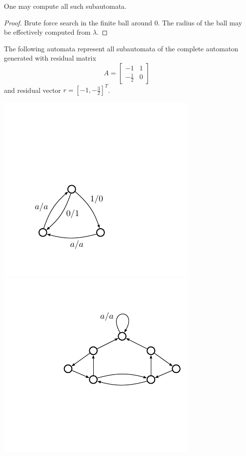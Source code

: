 \documentclass[11pt, titlepage]{article}
\begin{document}
\begin{lemma}
  One may compute all such subautomata.
\end{lemma}
\begin{proof}
  Brute force search in the finite ball around 0. The radius of the
  ball may be effectively computed from $\lambda$.
\end{proof}

\begin{example}
The following automata represent all subautomata of
the complete automaton generated with residual matrix
\[
  A = \begin{bmatrix}
    -1 &1\\
    -\frac{1}{2} & 0
    \end{bmatrix}
\]
and residual vector $r = [-1, -\frac{3}{2}]^T$.

\vspace{-5em}
\begin{center}
\includegraphics[scale=0.5]{figures/a32}
\includegraphics[scale=0.5]{figures/bowtie}

\end{center}
\end{example}
\end{document}
